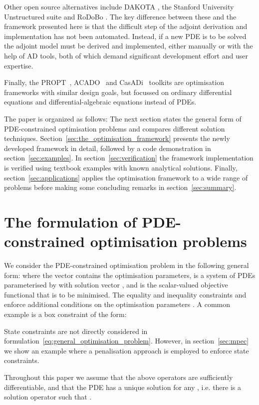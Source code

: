\documentclass[prodmode,acmtoms]{acmsmall}
\begin{document}
Other open source alternatives include DAKOTA \cite{eldred1996}, the Stanford University Unstructured suite \cite{palacios2012} and RoDoBo \cite{becker2005}.
The key difference between these and the framework presented here is that the difficult step of the adjoint derivation and implementation has not been automated. 
Instead, if a new PDE is to be solved the adjoint model must be derived and implemented, either manually or with the help of AD tools,
both of which demand significant development effort and user expertise.

Finally, the PROPT~\cite{propt}, ACADO~\cite{houska2011} and CasADi~\cite{andersson2012} toolkits are optimisation frameworks with similar design goals, but focussed on ordinary differential equations and differential-algebraic equations instead of PDEs.

The paper is organized as follows: 
The next section states the general form of PDE-constrained optimisation problems and compares different solution techniques.
Section~\ref{sec:the_optimisation_framework} presents the newly developed framework in detail, followed by a code demonstration in section~\ref{sec:examples}.
In section~\ref{sec:verification} the framework implementation is verified using textbook examples with known analytical solutions. 
Finally, section~\ref{sec:applications} applies the optimisation framework to a wide range of problems before making some concluding remarks in section~\ref{sec:summary}. 

\section{The formulation of PDE-constrained optimisation problems}\label{sec:optpde_problem_formulation}

We consider the PDE-constrained optimisation problem in the following general form:
 where the vector  contains the optimisation parameters,
 is a system of PDEs parameterised by  with solution vector , and
 is the scalar-valued objective functional that is to be minimised.
The equality and inequality constraints  and  enforce additional conditions  on the optimisation parameters .
A common example is a box constraint of the form:

State constraints are not directly considered in formulation~\eqref{eq:general_optimisation_problem}. 
However, in section~\ref{sec:mpec} we show an example where a penalisation approach is employed to enforce state constraints.

Throughout this paper we assume that the above operators are sufficiently differentiable, and that the PDE has a unique solution for any , i.e.
there is a solution operator  such that .
\end{document}
